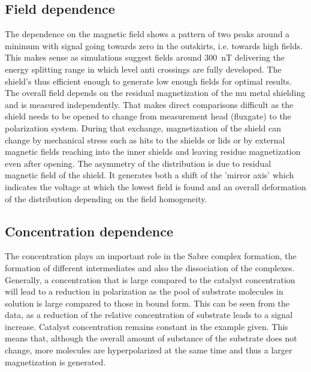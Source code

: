         \subsection{Field dependence}
        The dependence on the magnetic field shows a pattern of two peaks around a minimum with signal going towards zero in the outskirts, i.e. towards high fields. This makes sense as simulations suggest fields around \SI{300}{\nano\tesla} delivering the energy splitting range in which level anti crossings are fully developed. The shield's thus efficient enough to generate low enough fields for optimal results. The overall field depends on the residual magnetization of the mu metal shielding and is measured independently. That makes direct comparisons difficult as the shield needs to be opened to change from measurement head (fluxgate) to the polarization system. During that exchange, magnetization of the shield can change by mechanical stress such as hits to the shields or lids or by external magnetic fields reaching into the inner shields and leaving residue magnetization even after opening. The asymmetry of the distribution is due to residual magnetic field of the shield. It generates both a shift of the 'mirror axis' which indicates the voltage at which the lowest field is found  and an overall deformation of the distribution depending on the field homogeneity.
        \subsection{Concentration dependence}
            The concentration plays an important role in the Sabre complex formation, the formation of different intermediates and also the dissociation of the complexes. Generally, a concentration that is large compared to the catalyst concentration will lead to a reduction in polarization as the pool of substrate molecules in solution is large compared to those in bound form. This can be seen from the data, as a reduction of the relative concentration of substrate leads to a signal increase. Catalyst concentration remains constant in the example given. This means that, although the overall amount of substance of the substrate does not change, more molecules are hyperpolarized at the same time and thus a larger magnetization is generated.
